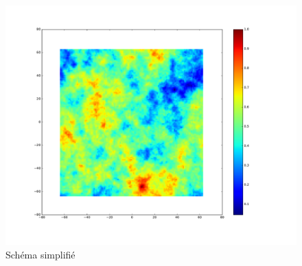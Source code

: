 \begin{figure}[th]
\centering
\includegraphics[scale=0.4]{Figures/motioncloud_noise}
\decoRule %
\caption[Figure]{Schéma simplifié}
\label{fig:motioncloud_noise}
\end{figure}

